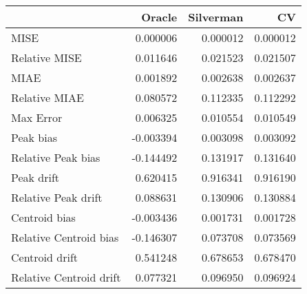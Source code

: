 \begin{tabular}{lrrr}
  \hline
 & Oracle & Silverman & CV \\ 
  \hline
MISE & 0.000006 & 0.000012 & 0.000012 \\ 
  Relative MISE & 0.011646 & 0.021523 & 0.021507 \\ 
  MIAE & 0.001892 & 0.002638 & 0.002637 \\ 
  Relative MIAE & 0.080572 & 0.112335 & 0.112292 \\ 
  Max Error & 0.006325 & 0.010554 & 0.010549 \\ 
  Peak bias & -0.003394 & 0.003098 & 0.003092 \\ 
  Relative Peak bias & -0.144492 & 0.131917 & 0.131640 \\ 
  Peak drift & 0.620415 & 0.916341 & 0.916190 \\ 
  Relative Peak drift & 0.088631 & 0.130906 & 0.130884 \\ 
  Centroid bias & -0.003436 & 0.001731 & 0.001728 \\ 
  Relative Centroid bias & -0.146307 & 0.073708 & 0.073569 \\ 
  Centroid drift & 0.541248 & 0.678653 & 0.678470 \\ 
  Relative Centroid drift & 0.077321 & 0.096950 & 0.096924 \\ 
   \hline
\end{tabular}

